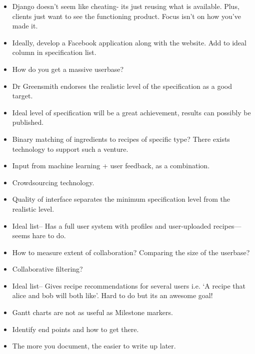 \documentclass[12pt]{article}
\begin{document}
\begin{itemize}
	\item Django doesn’t seem like cheating- its just reusing what is available. Plus, clients just want to see the functioning product. Focus isn’t on how you’ve made it.
	
	\item Ideally, develop a Facebook application along with the website. Add to ideal column in specification list.
	
	\item How do you get a massive userbase?
	
	\item Dr Greensmith endorses the realistic level of the specification as a good target.
	
	\item Ideal level of specification will be a great achievement, results can possibly be published.
	
	\item Binary matching of ingredients to recipes of specific type? There exists technology to support such a venture.
	
	\item Input from machine learning + user feedback, as a combination.
	
	\item Crowdsourcing technology.
	
	\item Quality of interface separates the minimum specification level from the realistic level.
	
	\item Ideal list-- Has a full user system with profiles and user-uploaded recipes—seems hare to do.
	
	\item How to measure extent of collaboration? Comparing the size of the userbase? 
	
	\item Collaborative filtering?
	
	\item Ideal list-- Gives recipe recommendations for several users i.e. ‘A recipe that alice and bob will both like’. Hard to do but its an awesome goal!
	
	\item Gantt charts are not as useful as Milestone markers.
	
	\item Identify end points and how to get there.
	
	\item The more you document, the easier to write up later.
	

\end{itemize}
\end{document}

